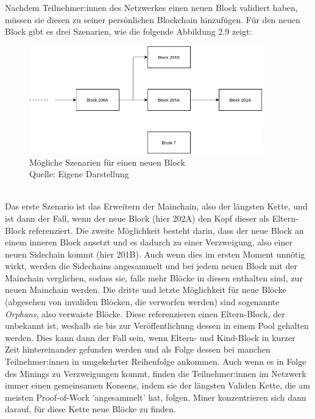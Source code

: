 Nachdem Teilnehmer:innen des Netzwerkes einen neuen Block validiert haben, müssen sie diesen zu seiner persönlichen Blockchain hinzufügen. Für den neuen Block gibt es drei Szenarien, wie die folgende Abbildung 2.9 zeigt:
\begin{figure}[htpb]
	\centering
	\includegraphics[width=0.9\textwidth]{images/chains.png}
	\caption{Mögliche Szenarien für einen neuen Block\\
	Quelle: Eigene Darstellung}
	\label{6braun:fig:chains}
\end{figure}\\
Das erste Szenario ist das Erweitern der Mainchain, also der längsten Kette, und ist dann der Fall, wenn der neue Block (hier 202A) den Kopf dieser als Eltern-Block referenziert.
Die zweite Möglichkeit besteht darin, dass der neue Block an einem inneren Block ansetzt und es dadurch zu einer Verzweigung, also einer neuen Sidechain kommt (hier 201B). Auch wenn dies im ersten Moment unnötig wirkt, werden die Sidechains angesammelt und bei jedem neuen Block mit der Mainchain verglichen, sodass sie, falls mehr Blöcke in diesen enthalten sind, zur neuen Mainchain werden.
Die dritte und letzte Möglichkeit für neue Blöcke (abgesehen von invaliden Blöcken, die verworfen werden) sind sogenannte \emph{Orphans}, also verwaiste Blöcke. Diese referenzieren einen Eltern-Block, der unbekannt ist, weshalb sie bis zur Veröffentlichung dessen in einem Pool gehalten werden. Dies kann dann der Fall sein, wenn Eltern- und Kind-Block in kurzer Zeit hintereinander gefunden werden und als Folge dessen bei manchen Teilnehmer:innen in umgekehrter Reihenfolge ankommen. Auch wenn es in Folge des Minings zu Verzweigungen kommt, finden die Teilnehmer:innen im Netzwerk immer einen gemeinsamen Konsens, indem sie der längsten Validen Kette, die am meisten Proof-of-Work 'angesammelt' hat, folgen. Miner konzentrieren sich dann darauf, für diese Kette neue Blöcke zu finden.\\

